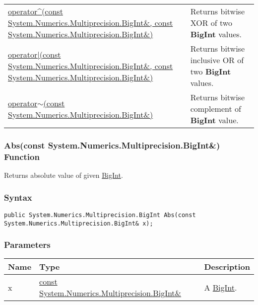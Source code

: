 \documentclass[a4paper,oneside,11.000000pt]{book}
\begin{document}
\begin{flushleft}
\begin{supertabular}[l]{!{\raggedright}p{7.575cm}!{\raggedright}p{7.575cm}}
\\
\hyperlink{System.Numerics.Multiprecision.operator.xor.C.R.System.Numerics.Multiprecision.BigInt.C.R.System.Numerics.Multiprecision.BigInt}{operator\^{}(const System.\-Numerics.\-Multiprecision.\-BigInt\&\-, const System.\-Numerics.\-Multiprecision.\-BigInt\&\-)}
& Returns bitwise XOR of two \textbf{BigInt}
 values.

\\
\hyperlink{System.Numerics.Multiprecision.operator.or.C.R.System.Numerics.Multiprecision.BigInt.C.R.System.Numerics.Multiprecision.BigInt}{operator|(const System.\-Numerics.\-Multiprecision.\-BigInt\&\-, const System.\-Numerics.\-Multiprecision.\-BigInt\&\-)}
& Returns bitwise inclusive OR of two \textbf{BigInt}
 values.

\\
\hyperlink{System.Numerics.Multiprecision.operator.complement.C.R.System.Numerics.Multiprecision.BigInt}{operator$\sim$(const System.\-Numerics.\-Multiprecision.\-BigInt\&\-)}
& Returns bitwise complement of \textbf{BigInt}
 value.

\\
\end{supertabular}

\end{flushleft}
\clearpage

\hypertarget{System.Numerics.Multiprecision.Abs.C.R.System.Numerics.Multiprecision.BigInt}{\subsubsection*{Abs(const System.Numerics.Multiprecision.BigInt\&) Function}}
\begin{flushleft}
Returns absolute value of given \hyperlink{System.Numerics.Multiprecision.BigInt}{BigInt}.

\end{flushleft}
\subsubsection*{Syntax}
\texttt{public System.Numerics.Multiprecision.BigInt Abs(const System.Numerics.Multiprecision.BigInt\& x);}
\subsubsection*{Parameters}
\begin{flushleft}
\begin{supertabular}[l]{!{\raggedright}p{1.30721cm}!{\raggedright}p{8.55945cm}!{\raggedright}p{2.65538cm}}
\textbf{Name}
& \textbf{Type}
& \textbf{Description}
\\
\hline
x
& \hyperlink{System.Numerics.Multiprecision.BigInt}{const System.\-Numerics.\-Multiprecision.\-BigInt\&\-}
& A \hyperlink{System.Numerics.Multiprecision.BigInt}{BigInt}.

\\
\end{supertabular}

\end{flushleft}
\end{document}
